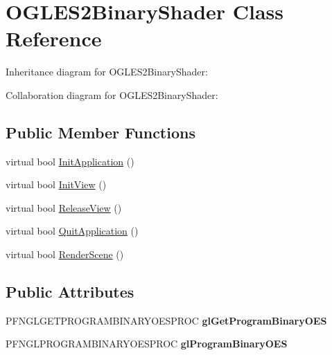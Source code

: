 \hypertarget{class_o_g_l_e_s2_binary_shader}{\section{O\+G\+L\+E\+S2\+Binary\+Shader Class Reference}
\label{class_o_g_l_e_s2_binary_shader}
}


Inheritance diagram for O\+G\+L\+E\+S2\+Binary\+Shader\+:


Collaboration diagram for O\+G\+L\+E\+S2\+Binary\+Shader\+:
\subsection*{Public Member Functions}
\begin{DoxyCompactItemize}
\item 
virtual bool \hyperlink{class_o_g_l_e_s2_binary_shader_a9ca42237352511f3fd52f2138dbc9f36}{Init\+Application} ()
\item 
virtual bool \hyperlink{class_o_g_l_e_s2_binary_shader_adc465b55760fe46c050ea8620a5f9827}{Init\+View} ()
\item 
virtual bool \hyperlink{class_o_g_l_e_s2_binary_shader_a62f691e20791a4036f1e2011317bc83b}{Release\+View} ()
\item 
virtual bool \hyperlink{class_o_g_l_e_s2_binary_shader_ae753af9b31ca2090e0035efc1914cbb4}{Quit\+Application} ()
\item 
virtual bool \hyperlink{class_o_g_l_e_s2_binary_shader_a186db62d792d475b4e50730e74f81d6c}{Render\+Scene} ()
\end{DoxyCompactItemize}
\subsection*{Public Attributes}
\begin{DoxyCompactItemize}
\item 
\hypertarget{class_o_g_l_e_s2_binary_shader_ade27f47f7650d365febae8e772fc8488}{P\+F\+N\+G\+L\+G\+E\+T\+P\+R\+O\+G\+R\+A\+M\+B\+I\+N\+A\+R\+Y\+O\+E\+S\+P\+R\+O\+C {\bfseries gl\+Get\+Program\+Binary\+O\+E\+S}}\label{class_o_g_l_e_s2_binary_shader_ade27f47f7650d365febae8e772fc8488}

\item 
\hypertarget{class_o_g_l_e_s2_binary_shader_ab2df15df25b21611207ee8c99df4ae03}{P\+F\+N\+G\+L\+P\+R\+O\+G\+R\+A\+M\+B\+I\+N\+A\+R\+Y\+O\+E\+S\+P\+R\+O\+C {\bfseries gl\+Program\+Binary\+O\+E\+S}}\label{class_o_g_l_e_s2_binary_shader_ab2df15df25b21611207ee8c99df4ae03}

\end{DoxyCompactItemize}


